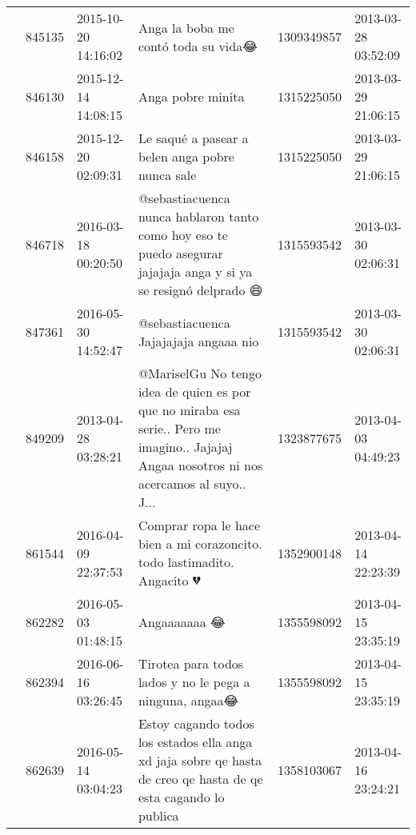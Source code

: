 \begin{tabular}{llllrl}
           & 845135  & 2015-10-20 14:16:02 &                                                                                                          Anga la boba me contó toda su vida😂 &  1309349857 & 2013-03-28 03:52:09 \\
           & 846130  & 2015-12-14 14:08:15 &                                                                                                                            Anga pobre minita &  1315225050 & 2013-03-29 21:06:15 \\
           & 846158  & 2015-12-20 02:09:31 &                                                                                              Le saqué a pasear a belen anga pobre nunca sale &  1315225050 & 2013-03-29 21:06:15 \\
           & 846718  & 2016-03-18 00:20:50 &                              @sebastiacuenca nunca hablaron tanto como hoy eso te puedo asegurar jajajaja anga y si ya se resignó delprado 😄 &  1315593542 & 2013-03-30 02:06:31 \\
           & 847361  & 2016-05-30 14:52:47 &                                                                                                        @sebastiacuenca Jajajajaja angaaa nio &  1315593542 & 2013-03-30 02:06:31 \\
           & 849209  & 2013-04-28 03:28:21 &  @MariselGu No tengo idea de quien es por que no miraba esa serie.. Pero me imagino.. Jajajaj Angaa nosotros ni nos acercamos al suyo.. J... &  1323877675 & 2013-04-03 04:49:23 \\
           & 861544  & 2016-04-09 22:37:53 &                                                                     Comprar ropa le hace bien a mi corazoncito. todo lastimadito. Angacito 💔 &  1352900148 & 2013-04-14 22:23:39 \\
           & 862282  & 2016-05-03 01:48:15 &                                                                                                                                 Angaaaaaaa 😂 &  1355598092 & 2013-04-15 23:35:19 \\
           & 862394  & 2016-06-16 03:26:45 &                                                                                      Tirotea para todos lados y no le pega a ninguna, angaa😂 &  1355598092 & 2013-04-15 23:35:19 \\
           & 862639  & 2016-05-14 03:04:23 &                             Estoy cagando todos los estados ella anga xd jaja sobre qe hasta de creo qe hasta de qe esta cagando lo publica󾍄 &  1358103067 & 2013-04-16 23:24:21 \\

\end{tabular}
